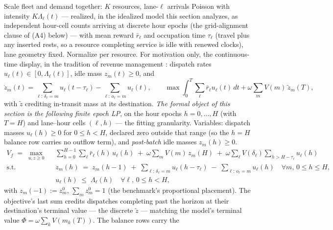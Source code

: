 \documentclass[11pt]{article}
\begin{document}
Scale fleet and demand together: $K$ resources, lane-$\ell$ arrivals
Poisson with intensity $K \Lambda_{\ell}(t)$ --- realized, in the
idealized model this section analyzes, as independent hour-cell
counts arriving at discrete hour epochs (the grid-alignment clause of
(A4) below) --- with mean reward
$\bar{r}_{\ell}$ and occupation time $\tau_{\ell}$ (travel plus any
inserted rests, so a resource completing service is idle with renewed
clocks), lane geometry fixed.
Normalize per resource. For motivation only, the continuous-time
display, in the tradition of revenue management
\citep{gallego1997network}: dispatch rates
$u_{\ell}(t) \in [0, \Lambda_{\ell}(t)]$, idle mass
$z_m(t) \geq 0$, and
\begin{equation}
  \dot{z}_m(t) = \sum_{\ell:\, \delta_{\ell} = m} u_{\ell}(t - \tau_{\ell})
  - \sum_{\ell:\, o_{\ell} = m} u_{\ell}(t), \qquad
  \max \int_0^T \sum_{\ell} \bar{r}_{\ell} u_{\ell}(t)\, dt
  + \omega \sum_m V(m)\, \tilde{z}_m(T),
  \label{eq:fluid}
\end{equation}
with $\tilde{z}$ crediting in-transit mass at its destination.
\emph{The formal object of this section is the following finite
epoch LP}, on the hour epochs $h = 0, \dots, H$ (with $T = H$) and
lane--hour cells $(\ell, h)$ --- the fitting granularity. Variables:
dispatch masses $u_{\ell}(h) \geq 0$ for $0 \leq h < H$, declared
zero outside that range (so the $h = H$ balance row carries no
outflow term), and \emph{post-batch} idle masses $z_m(h) \geq 0$.
\begin{align}
  V_f \;=\; \max_{u, z \geq 0}\;\;
  & \sum_{h=0}^{H-1} \sum_{\ell} \bar{r}_{\ell}(h)\, u_{\ell}(h)
  \;+\; \omega \sum_m V(m)\, z_m(H)
  \;+\; \omega \sum_{\ell} V(\delta_{\ell})
      \!\!\sum_{h > H - \tau_{\ell}}\!\! u_{\ell}(h)
  \label{eq:epochlp} \\
  \text{s.t.}\;\;
  & z_m(h) \;=\; z_m(h{-}1)
    \;+\; \sum_{\ell:\, \delta_{\ell} = m} u_{\ell}(h - \tau_{\ell})
    \;-\; \sum_{\ell:\, o_{\ell} = m} u_{\ell}(h)
    \quad \forall m,\, 0 \leq h \leq H,
    \label{eq:discreteflow} \\
  & u_{\ell}(h) \;\leq\; \Lambda_{\ell}(h)
    \quad \forall \ell,\, 0 \leq h < H, \nonumber
\end{align}
with $z_m(-1) := z^0_m$, $\sum_m z^0_m = 1$ (the benchmark's
proportional placement). The objective's last sum credits dispatches
completing past the horizon at their destination's terminal value ---
the discrete $\tilde{z}$ --- matching the model's terminal value
$\Phi = \omega \sum_k V(m_k(T))$. The balance rows carry the
\end{document}
